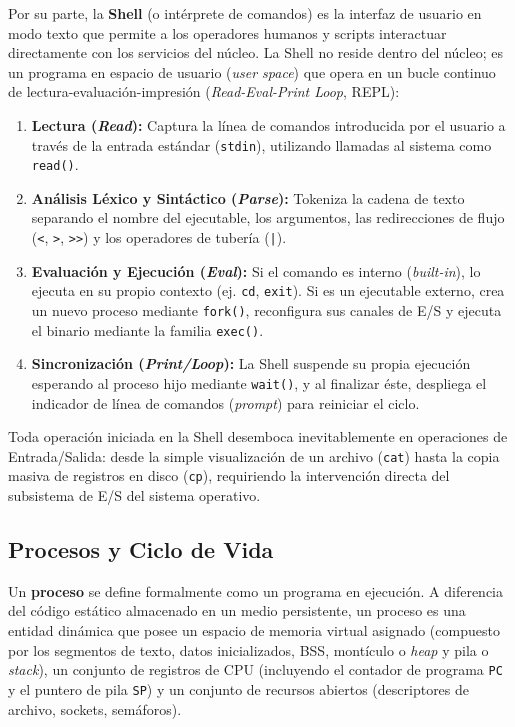 \documentclass[11pt,letterpaper]{article}
\begin{document}
Por su parte, la \textbf{Shell} (o intérprete de comandos) es la interfaz de usuario en modo texto que permite a los operadores humanos y scripts interactuar directamente con los servicios del núcleo. La Shell no reside dentro del núcleo; es un programa en espacio de usuario (\textit{user space}) que opera en un bucle continuo de lectura-evaluación-impresión (\textit{Read-Eval-Print Loop}, REPL):
\begin{enumerate}
    \item \textbf{Lectura (\textit{Read}):} Captura la línea de comandos introducida por el usuario a través de la entrada estándar (\texttt{stdin}), utilizando llamadas al sistema como \texttt{read()}.
    \item \textbf{Análisis Léxico y Sintáctico (\textit{Parse}):} Tokeniza la cadena de texto separando el nombre del ejecutable, los argumentos, las redirecciones de flujo (\texttt{\string<}, \texttt{\string>}, \texttt{\string>\string>}) y los operadores de tubería (\texttt{|}).
    \item \textbf{Evaluación y Ejecución (\textit{Eval}):} Si el comando es interno (\textit{built-in}), lo ejecuta en su propio contexto (ej. \texttt{cd}, \texttt{exit}). Si es un ejecutable externo, crea un nuevo proceso mediante \texttt{fork()}, reconfigura sus canales de E/S y ejecuta el binario mediante la familia \texttt{exec()}.
    \item \textbf{Sincronización (\textit{Print/Loop}):} La Shell suspende su propia ejecución esperando al proceso hijo mediante \texttt{wait()}, y al finalizar éste, despliega el indicador de línea de comandos (\textit{prompt}) para reiniciar el ciclo.
\end{enumerate}

Toda operación iniciada en la Shell desemboca inevitablemente en operaciones de Entrada/Salida: desde la simple visualización de un archivo (\texttt{cat}) hasta la copia masiva de registros en disco (\texttt{cp}), requiriendo la intervención directa del subsistema de E/S del sistema operativo.

\subsection{Procesos y Ciclo de Vida}

Un \textbf{proceso} se define formalmente como un programa en ejecución. A diferencia del código estático almacenado en un medio persistente, un proceso es una entidad dinámica que posee un espacio de memoria virtual asignado (compuesto por los segmentos de texto, datos inicializados, BSS, montículo o \textit{heap} y pila o \textit{stack}), un conjunto de registros de CPU (incluyendo el contador de programa \texttt{PC} y el puntero de pila \texttt{SP}) y un conjunto de recursos abiertos (descriptores de archivo, sockets, semáforos).
\end{document}
